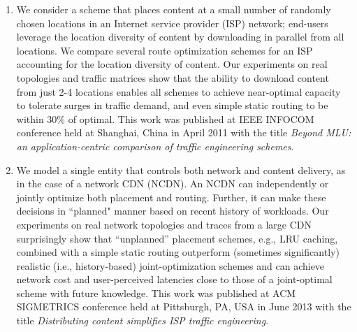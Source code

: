 \begin{enumerate}
\item
We consider a scheme that places content at a small number of randomly chosen locations in an Internet service provider (ISP) network; end-users leverage the location diversity of content by downloading in parallel from all locations. We compare several route optimization schemes for an ISP accounting for the location diversity of content. Our experiments on real topologies and traffic matrices show that the ability to download content from just 2-4 locations enables all schemes to achieve near-optimal capacity to tolerate surges in traffic demand, and even simple static routing to be within 30\% of optimal. This work was published at IEEE INFOCOM conference held at Shanghai, China in April 2011 with the title \emph{Beyond MLU: an application-centric comparison of traffic engineering schemes}.
\item
We model a single entity that controls both network and content delivery, as in the case of a network CDN (NCDN). An NCDN can independently or jointly optimize both placement and routing. Further, it can make these decisions in ``planned" manner based on recent history of workloads. Our experiments on real network topologies and traces from a large CDN surprisingly show that  ``unplanned'' placement schemes, e.g., LRU caching, combined with a simple static routing outperform (sometimes significantly)  realistic (i.e., history-based) joint-optimization schemes and can achieve network cost and user-perceived latencies close to those of a joint-optimal scheme with future knowledge. This work was published at ACM SIGMETRICS conference held at Pittsburgh, PA, USA  in June 2013 with the title \emph{Distributing content simplifies ISP traffic engineering}.

\end{enumerate}

